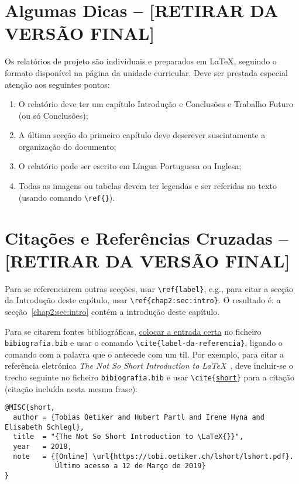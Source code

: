 % 
\section{Algumas Dicas -- [RETIRAR DA VERSÃO FINAL]}
Os relatórios de projeto são individuais e preparados em \LaTeX, seguindo o formato disponível na página da unidade curricular. Deve ser prestada especial atenção aos seguintes pontos:
\begin{enumerate}
  \item O relatório deve ter um capítulo Introdução e Conclusões e Trabalho Futuro (ou só Conclusões);
  \item A última secção do primeiro capítulo deve descrever suscintamente a organização do documento;
  \item O relatório pode ser escrito em Língua Portuguesa ou Inglesa;
  \item Todas as imagens ou tabelas devem ter legendas e ser referidas no texto (usando comando \texttt{\textbackslash ref\{\}}).
\end{enumerate}


\section{Citações e Referências Cruzadas -- [RETIRAR DA VERSÃO FINAL]}
\label{chap2:sec:citacoes}

Para se referenciarem outras secções, usar \texttt{\textbackslash{}ref\{label\}}, e.g., para citar a secção da Introdução deste capítulo, usar \texttt{\textbackslash{}ref\{chap2:sec:intro\}}. O resultado é: a secção~\ref{chap2:sec:intro} contém a introdução deste capítulo.

Para se citarem fontes bibliográficas, \underline{colocar a entrada certa} no ficheiro \texttt{bibiografia.bib} e usar o comando \texttt{\textbackslash{}cite\{label-da-referencia\}}, ligando o comando com a palavra que o antecede com um til. Por exemplo, para citar a referência eletrónica \emph{The Not So Short Introduction to \LaTeX{}}~\cite{short}, deve incluir-se o trecho seguinte no ficheiro \texttt{bibiografia.bib} e usar \texttt{\textbackslash{}cite\{\underline{short}\}} para a citação (citação incluída nesta mesma frase):
%
\begin{verbatim}
@MISC{short,
  author = {Tobias Oetiker and Hubert Partl and Irene Hyna and Elisabeth Schlegl},
  title  = "{The Not So Short Introduction to \LaTeX{}}",
  year   = 2018,
  note   = {[Online] \url{https://tobi.oetiker.ch/lshort/lshort.pdf}. 
            Último acesso a 12 de Março de 2019}
}
\end{verbatim}

